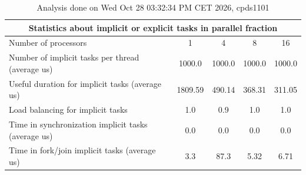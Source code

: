 \begin{table}[h]
\begin{center}
\begin{tabular}{|l|c|c|c|c|}
\hline
\multicolumn{5}{|c|}{Statistics about implicit or explicit tasks in parallel fraction} \\
\hline
\hline
Number of processors & 1 & 4 & 8 & 16 \\
\hline
\hline
Number of implicit tasks per thread (average us)    &          1000.0 &          1000.0 &          1000.0 &          1000.0 \\
\hline
Useful duration for implicit tasks (average us)     &         1809.59 &          490.14 &          368.31 &          311.05 \\
\hline
Load balancing for implicit tasks                &             1.0 &             0.9 &             1.0 &             1.0 \\
\hline
Time in synchronization implicit tasks (average us) &             0.0 &             0.0 &             0.0 &             0.0 \\
\hline
Time in fork/join implicit tasks (average us)       &             3.3 &            87.3 &            5.32 &            6.71 \\
\hline
\end{tabular}
\end{center}
\caption{ Analysis done on Wed Oct 28 03:32:34 PM CET 2026, cpds1101}
\end{table}
